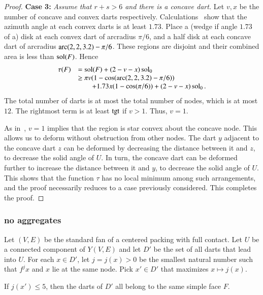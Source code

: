 \begin{proof}
{\bf Case 3:}
{\it Assume that $r+s>6$ and there is a concave dart.}  Let $v,x$ be the number of concave and convex darts respectively.  Calculations~\cite[cc:lft]{hales:2009:nonlinear} show that the azimuth angle at each convex darts is at least $1.73$.  Place a (wedge if angle $1.73$ of a) disk at each convex dart of arcradius $\pi/6$, and a half disk at each concave dart of arcradius $\operatorname{arc}(2,2,3.2)-\pi/6$.  These regions are disjoint and their combined area is less than $\operatorname{sol}(F)$.  Hence
$$
\begin{array}{lll}
\tau(F)&=\operatorname{sol}(F)+(2-v-x)\operatorname{sol}_0 \\
  &\ge \pi v (1-\cos(\operatorname{arc}(2,2,3.2)-\pi/6)) \\
  &\qquad+ 1.73 x (1-\cos(\pi/6)) + (2-v-x)\operatorname{sol}_0.
\end{array}
$$
The total number of darts is at most the total number of nodes, which is at most $12$.  The rightmost term is at least ${\operatorname{tgt}}$ if $v> 1$. Thus, $v=1$.
%
%

As in~\cite{Hales:2006:DCG}, $v=1$ implies that the region is star convex about the concave node.  This allows us to deform without obstruction from other nodes.  The dart $y$ adjacent to the concave dart $z$ can be deformed by decreasing the distance between it and $z$, to decrease the solid angle of $U$.  In turn, the concave dart can be deformed further to increase the distance between it and $y$, to decrease the solid angle of $U$.  This shows that the function $\tau$ has no local minimum among such arrangements, and the proof necessarily reduces to a case previously considered.  This completes the proof.
\end{proof}
%
%

\subsubsection{no aggregates}

Let $(V,E)$ be the standard fan of a centered packing with full contact.  Let $U$ be a connected component of $Y(V,E)$ and let $D'$ be the set of all darts that lead into $U$.  For each $x\in D'$, let $j = j(x) >0$ be the smallest natural number such that $f^j x$ and $x$ lie at the same node.  Pick $x'\in D'$ that maximizes $x\mapsto j(x)$.  
%
%

\begin{lemma}\label{lemma:DU}  If $j(x')\le 5$, then the darts of $D'$ all belong to the same simple face $F$.
\end{lemma}
%

